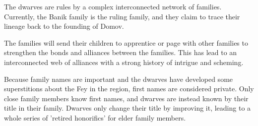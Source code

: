 The dwarves are rules by a complex interconnected network of families.
Currently, the Banik family is the ruling family, and they claim to trace their lineage back to the founding of Domov.

The families will send their children to apprentice or page with other families to strengthen the bonds and alliances between the families.
This has lead to an interconnected web of alliances with a strong history of intrigue and scheming.

Because family names are important and the dwarves have developed some superstitions about the Fey in the region, first names are considered private.
Only close family members know first names, and dwarves are instead known by their title in their family.
Dwarves only change their title by improving it, leading to a whole series of 'retired honorifics' for elder family members.
